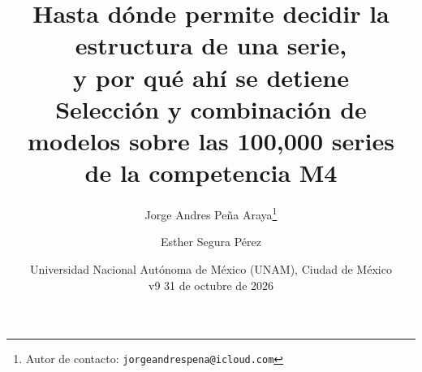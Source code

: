 %
%

\title{Hasta dónde permite decidir la estructura de una serie,\\
       y por qué ahí se detiene\\
       \large Selección y combinación de modelos sobre las 100{,}000 series\\
       de la competencia M4}

\author{Jorge Andres Pe\~na Araya\thanks{Autor de contacto:
        \texttt{jorgeandrespena@icloud.com}} \and Esther Segura P\'erez}
\newcommand{\versionborrador}{v9 \textperiodcentered{} 31 de octubre de 2026}

\date{Universidad Nacional Aut\'onoma de M\'exico (UNAM), Ciudad de M\'exico\\[2pt]
      {\small\ttfamily\versionborrador}}

\decimalpoint

\setlength{\floatsep}{8pt plus 2pt minus 2pt}
\setlength{\textfloatsep}{10pt plus 2pt minus 2pt}
\setlength{\intextsep}{8pt plus 2pt minus 2pt}
\renewcommand{\topfraction}{0.9}
\renewcommand{\bottomfraction}{0.8}
\renewcommand{\textfraction}{0.07}
\renewcommand{\floatpagefraction}{0.8}
\setcounter{topnumber}{3}
\setcounter{bottomnumber}{2}
\setcounter{totalnumber}{4}

